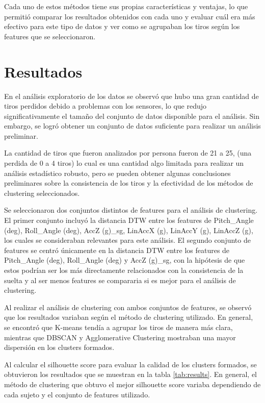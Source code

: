 \documentclass[11pt,a4paper,twocolumn,twoside]{rho-class/rho}
\begin{document}
        Cada uno de estos métodos tiene sus propias características y ventajas, lo que permitió comparar los resultados obtenidos con cada uno y evaluar cuál era más efectivo para este tipo de datos y ver como se agrupaban los tiros según los features que se seleccionaron.

\section{Resultados}

    En el análisis exploratorio de los datos se observó que hubo una gran cantidad de tiros perdidos debido a problemas con los sensores, lo que redujo significativamente el tamaño del conjunto de datos disponible para el análisis. Sin embargo, se logró obtener un conjunto de datos suficiente para realizar un análisis preliminar.

    La cantidad de tiros que fueron analizados por persona fueron de 21 a 25, (una perdida de 0 a 4 tiros) lo cual es una cantidad algo limitada para realizar un análisis estadístico robusto, pero se pueden obtener algunas conclusiones preliminares sobre la consistencia de los tiros y la efectividad de los métodos de clustering seleccionados.

    Se seleccionaron dos conjuntos distintos de features para el análisis de clustering. El primer conjunto incluyó la distancia DTW entre los features de Pitch\_Angle (deg), Roll\_Angle (deg), AccZ (g)\_sg, LinAccX (g), LinAccY (g), LinAccZ (g), los cuales se consideraban relevantes para este análisis. El segundo conjunto de features se centró únicamente en la distancia DTW entre los features de Pitch\_Angle (deg), Roll\_Angle (deg) y AccZ (g)\_sg, con la hipótesis de que estos podrían ser los más directamente relacionados con la consistencia de la suelta y al ser menos features se compararia si es mejor para el análisis de clustering.

    Al realizar el análisis de clustering con ambos conjuntos de features, se observó que los resultados variaban según el método de clustering utilizado. En general, se encontró que K-means tendía a agrupar los tiros de manera más clara, mientras que DBSCAN y Agglomerative Clustering mostraban una mayor dispersión en los clusters formados. 

    Al calcular el silhouette score para evaluar la calidad de los clusters formados, se obtuvieron los resultados que se muestran en la tabla \ref{tab:results}. En general, el método de clustering que obtuvo el mejor silhouette score variaba dependiendo de cada sujeto y el conjunto de features utilizado.
\end{document}
